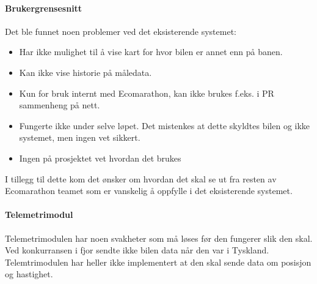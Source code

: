 \paragraph{Brukergrensesnitt}
Det ble funnet noen problemer ved det eksisterende systemet:
\begin{itemize}
\item Har ikke mulighet til å vise kart for hvor bilen er annet enn på banen.
\item Kan ikke vise historie på måledata.
\item Kun for bruk internt med Ecomarathon, kan ikke brukes f.eks. i PR sammenheng på nett.
\item Fungerte ikke under selve løpet. Det mistenkes at dette skyldtes bilen og ikke systemet, men ingen vet sikkert.
\item Ingen på prosjektet vet hvordan det brukes
\end{itemize}
I tillegg til dette kom det ønsker om hvordan det skal se ut fra resten av Ecomarathon teamet som er vanskelig å oppfylle i det eksisterende systemet.

\paragraph{Telemetrimodul}
Telemetrimodulen har noen svakheter som må løses før den fungerer slik den skal.
Ved konkurransen i fjor sendte ikke bilen data når den var i Tyskland.
Telemtrimodulen har heller ikke implementert at den skal sende data om posisjon og hastighet.